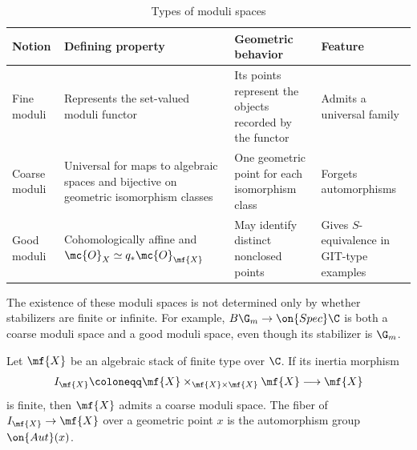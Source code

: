 \begin{table}[htpb]
    \centering
    \caption{Types of moduli spaces}
    \label{tab:moduli-types-corrected}
    \renewcommand{\arraystretch}{1.3}
    \begin{tabular}{
        p{}
        p{}
        p{}
        p{}
    }
        \toprule
        \textbf{Notion}
        & \textbf{Defining property}
        & \textbf{Geometric behavior}
        & \textbf{Feature}
        \\
        \midrule
        Fine moduli
        & Represents the set-valued moduli functor
        & Its points represent the objects recorded by the functor
        & Admits a universal family
        \\
        Coarse moduli
        & Universal for maps to algebraic spaces and bijective on geometric isomorphism classes
        & One geometric point for each isomorphism class
        & Forgets automorphisms
        \\
        Good moduli
        & Cohomologically affine and
          \(\mc{O}_X \simeq q_*\mc{O}_{\mf{X}}\)
        & May identify distinct nonclosed points
        & Gives \(S\)-equivalence in GIT-type examples
        \\
        \bottomrule
    \end{tabular}
\end{table}

The existence of these moduli spaces is not determined only by whether stabilizers are finite or infinite. For example, \(B\G_m\to\on{Spec}\C\) is both a coarse moduli space and a good moduli space, even though its stabilizer is \(\G_m\).

\begin{thm}
    Let \(\mf{X}\) be an algebraic stack of finite type over \(\C\). If its inertia morphism
    \[
        I_{\mf{X}}
        \coloneqq
        \mf{X}\times_{\mf{X}\times\mf{X}}\mf{X}
        \longrightarrow \mf{X}
    \]
    is finite, then \(\mf{X}\) admits a coarse moduli space. The fiber of \(I_{\mf{X}}\to\mf{X}\) over a geometric point \(x\) is the automorphism group \(\on{Aut}(x)\).
\end{thm}

